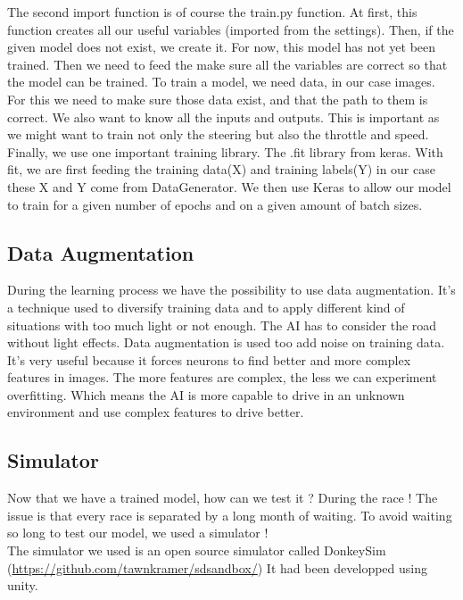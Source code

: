\documentclass[12pt]{article}
\begin{document}
The second import function is of course the train.py function. At first, this function creates all our useful variables (imported from the settings). Then, if the given model does not exist, we create it. For now, this model has not yet been trained.  Then we need to feed the make sure all the variables are correct so that the model can be trained.  To train a model, we need data, in our case images. For this we need to make sure those data exist, and that the path to them is correct.  
We also want to know all the inputs and outputs. This is important as we might want to train not only the steering but also the throttle and speed.  
Finally, we use one important training library. The .fit library from keras. With fit, we are first feeding the training data(X) and training labels(Y) in our case these X and Y come from DataGenerator. We then use Keras to allow our model to train for a given number of epochs and on a given amount of batch sizes. 

\subsection{Data Augmentation}
During the learning process we have the possibility to use data augmentation. It’s a technique used to diversify training data and to apply different kind of situations with too much light or not enough. The AI has to consider the road without light effects. Data augmentation is used too add noise on training data. It’s very useful because it forces neurons to find better and more complex features in images. The more features are complex, the less we can experiment overfitting. Which means the AI is more capable to drive in an unknown environment and use complex features to drive better.
\newpage

\subsection{Simulator}
Now that we have a trained model, how can we test it ? During the race ! The issue is that every race is separated by a long month of waiting. To avoid waiting so long to test our model, we used a simulator ! \\
The simulator we used is an open source simulator called DonkeySim \\(\href{https://github.com/tawnkramer/sdsandbox/}{https://github.com/tawnkramer/sdsandbox/}) It had been developped using unity. \\ \\
\end{document}
